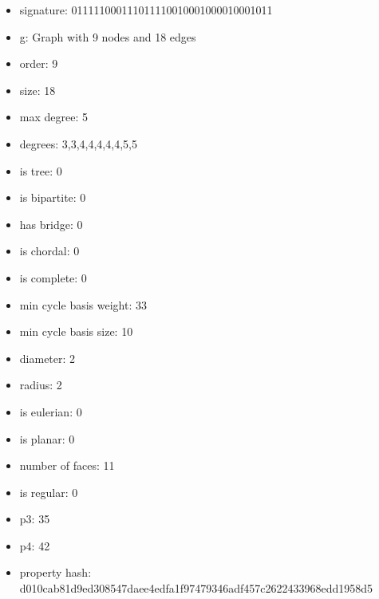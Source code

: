 \newpage
\begin{figure}
\end{figure}
\begin{itemize}
\item signature: 011111000111011110010001000010001011
\item g: Graph with 9 nodes and 18 edges
\item order: 9
\item size: 18
\item max degree: 5
\item degrees: 3,3,4,4,4,4,4,5,5
\item is tree: 0
\item is bipartite: 0
\item has bridge: 0
\item is chordal: 0
\item is complete: 0
\item min cycle basis weight: 33
\item min cycle basis size: 10
\item diameter: 2
\item radius: 2
\item is eulerian: 0
\item is planar: 0
\item number of faces: 11
\item is regular: 0
\item p3: 35
\item p4: 42
\item property hash: d010cab81d9ed308547daee4edfa1f97479346adf457c2622433968edd1958d5
\end{itemize}
